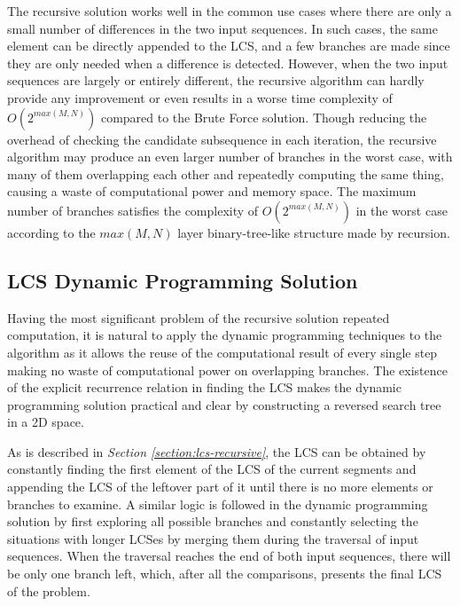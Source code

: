 \documentclass[sigplan,screen]{acmart}
\begin{document}
The recursive solution works well in the common use cases where there are only a small number of differences in the two input sequences. In such cases, the same element can be directly appended to the LCS, and a few branches are made since they are only needed when a difference is detected. \cite{bergrothSurveyLongestCommon2000} However, when the two input sequences are largely or entirely different, the recursive algorithm can hardly provide any improvement or even results in a worse time complexity of $O(2^{max(M, N)})$ compared to the Brute Force solution. \cite{bergrothSurveyLongestCommon2000, hirschbergAlgorithmsLongestCommon1977} Though reducing the overhead of checking the candidate subsequence in each iteration, the recursive algorithm may produce an even larger number of branches in the worst case, with many of them overlapping each other and repeatedly computing the same thing, causing a waste of computational power and memory space. The maximum number of branches satisfies the complexity of $O(2^{max(M, N)})$ in the worst case according to the $max(M, N)$ layer binary-tree-like structure made by recursion.


\subsection{LCS Dynamic Programming Solution}
\label{section:lcs-dynamic-programming}

Having the most significant problem of the recursive solution repeated computation, it is natural to apply the dynamic programming techniques to the algorithm as it allows the reuse of the computational result of every single step making no waste of computational power on overlapping branches. \cite{bellmanDynamicProgramming1966, eddyWhatDynamicProgramming2004, howardDynamicProgramming1966, patersonLongestCommonSubsequences1994} The existence of the explicit recurrence relation in finding the LCS makes the dynamic programming solution practical and clear by constructing a reversed search tree in a 2D space. \cite{bergrothSurveyLongestCommon2000, patersonLongestCommonSubsequences1994}

As is described in \textit{Section \ref{section:lcs-recursive}}, the LCS can be obtained by constantly finding the first element of the LCS of the current segments and appending the LCS of the leftover part of it until there is no more elements or branches to examine. A similar logic is followed in the dynamic programming solution by first exploring all possible branches and constantly selecting the situations with longer LCSes by merging them during the traversal of input sequences. When the traversal reaches the end of both input sequences, there will be only one branch left, which, after all the comparisons, presents the final LCS of the problem. \cite{bergrothSurveyLongestCommon2000, hirschbergLinearSpaceAlgorithm1975, patersonLongestCommonSubsequences1994}
\end{document}

